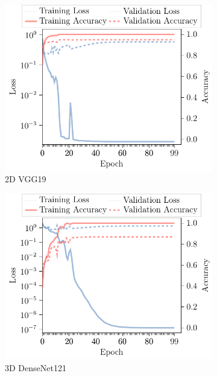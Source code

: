 \begin{subappendices}
\begin{figure}
\begin{subfigure}[t]{\modelplotwidth}
    \centering
    \includegraphics[width=\textwidth]{Figures/Appendix/VGG_2D.pdf}
    \caption{2D VGG19}\label{fig:VGG2D}
\end{subfigure}
\begin{subfigure}[t]{\modelplotwidth}
    \centering
    \includegraphics[width=\textwidth]{Figures/Appendix/DenseNet_3D.pdf}
    \caption{3D DenseNet121}\label{fig:DenseNet3D}
\end{subfigure}
\begin{subfigure}[t]{\modelplotwidth}
    \centering

\end{subfigure}
\end{figure}
\end{subappendices}
